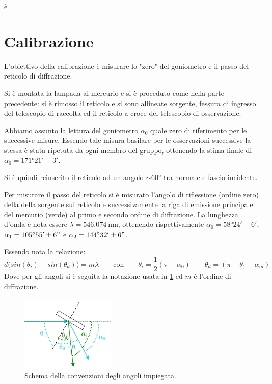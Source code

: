 è\section{Calibrazione}
	L'obiettivo della calibrazione è misurare lo "zero" del goniometro e il passo del reticolo di diffrazione.
	
	Si è montata la lampada al mercurio e si è proceduto come nella parte precedente:
	si è rimosso il reticolo e si sono allineate sorgente, fessura di ingresso del telescopio di raccolta
	ed il reticolo a croce del telescopio di osservazione.
	
	Abbiamo assunto la lettura del goniometro
	$\alpha_0$ quale zero di riferimento per le successive misure.
	Essendo tale misura basilare per le osservazioni successive la stessa è stata ripetuta da ogni membro del gruppo,
	ottenendo la stima finale di $\alpha_0 = \ang{171;21; } \pm 3' $.
	
	Si è quindi reinserito il reticolo ad un angolo $\sim \ang{60}$
	tra normale e fascio incidente.

	Per misurare il passo del reticolo si è misurato l'angolo di riflessione (ordine zero) della della sorgente sul reticolo e successivamente la riga di emissione principale del mercurio (verde) al 
	primo e secondo ordine di diffrazione. La lunghezza d'onda è nota essere $\lambda = \SI{546.074}{\nano\meter}$,
	ottenendo rispettivamente $\alpha_0=\ang{58;24;} \pm 6'$, $\alpha_1=\ang{105;55;}\pm 6"$ e $\alpha_2=\ang{144;32;}\pm 6"$.
	
	Essendo nota la relazione:
	\smallskip
	\begin{equation*}
	d\bigl(sin (\theta_i) - sin (\theta_d)\bigr) = m \lambda\qquad \text{con}\qquad \theta_i=\frac{1}{2}(\pi- \alpha_0)\qquad \theta_d=(\pi- \theta_1-\alpha_m)
	\end{equation*}
	Dove per gli angoli si è seguita la notazione usata in \figurename{ \ref{fig:angoli}} ed $m$ è l'ordine di diffrazione.
	\bigskip
	\begin{figure} [H]
		\centering
		\includegraphics[width=0.4\textwidth]{../FIgs-tabs/angoli.png}
		\caption{Schema della convenzioni degli angoli impiegata.}
		\label{fig:angoli}
	\end{figure}
	\smallskip

